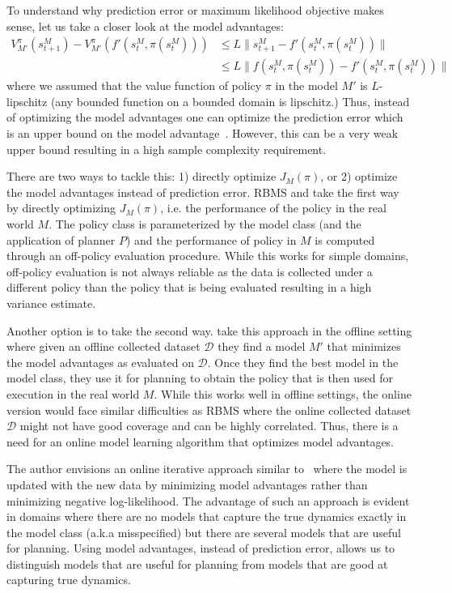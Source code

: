 To understand why prediction error or maximum likelihood objective
makes sense, let us take a
closer look at the model advantages:
\begin{align*}
  V_{M'}^\pi(s_{t+1}^M) - V^\pi_{M'}(f'(s_t^M, \pi(s_t^M))) &\leq
                                                              L\|s_{t+1}^M - f'(s_t^M, \pi(s_t^M))\| \\
  &\leq L\|f(s_t^M, \pi(s_t^M)) - f'(s_t^M, \pi(s_t^M))\|
\end{align*}
where we assumed that the value function of policy $\pi$ in the model
$M'$ is $L$-lipschitz (any bounded function on a bounded domain is
lipschitz.) Thus, instead of optimizing the model advantages one can
optimize the prediction error which is an upper bound on the
model advantage~\cite{DBLP:conf/icml/RossB12}. However, this can be a
very weak upper bound resulting in a high sample complexity
requirement.

There are two ways to tackle this: 1) directly optimize $J_{M}(\pi)$,
or 2) optimize the model advantages instead of prediction error. RBMS
and \taml{} take the first way by directly optimizing $J_M(\pi)$,
i.e. the performance of the policy in the real world $M$. The policy
class is parameterized by the model class (and the application of
planner $P$) and the performance of policy in $M$ is computed through
an off-policy evaluation procedure. While this works for simple
domains, off-policy evaluation is not always reliable as the data is
collected under a different policy than the policy that is being
evaluated resulting in a high variance estimate.

Another option is to take the second
way. \cite{DBLP:conf/aistats/VoloshinJY21} take this approach in the
offline setting where given an offline collected dataset $\mathcal{D}$
they find a model $M'$ that minimizes the model advantages as
evaluated on $\mathcal{D}$. Once they find the best model in the model
class, they use it for planning to obtain the policy that is then used
for execution in the real world $M$. While this works well in offline
settings, the online version would face similar difficulties as RBMS
where the online collected dataset $\mathcal{D}$ might not have good
coverage and can be highly correlated. Thus, there is a need for an
online model learning algorithm that optimizes model advantages.

The author envisions an online iterative approach similar
to~\cite{DBLP:conf/icml/RossB12} where the model is updated with the
new data by minimizing model advantages rather than minimizing
negative log-likelihood. The advantage of such an approach is evident
in domains where there are no models that capture the true dynamics
exactly in the model class (a.k.a misspecified) but there are several
models that are useful for planning. Using model advantages, instead
of prediction error, allows us to distinguish models that are useful
for planning from models that are good at capturing true dynamics.

